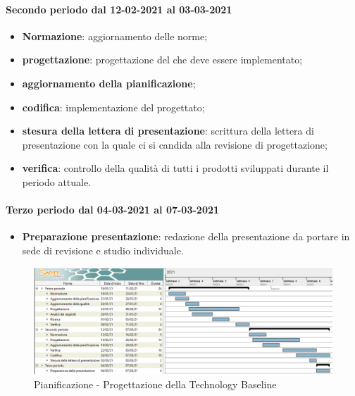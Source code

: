 \paragraph{Secondo periodo dal 12-02-2021 al 03-03-2021} 
\begin{itemize} 
	\item \textbf{Normazione}: aggiornamento delle norme; 
	\item \textbf{progettazione}: progettazione del  che deve essere implementato; 
	\item \textbf{aggiornamento della pianificazione}; 
	\item \textbf{codifica}: implementazione del  progettato; 
	\item \textbf{stesura della lettera di presentazione}: scrittura della lettera di presentazione con la quale ci 
	si candida alla revisione di progettazione; 
	\item \textbf{verifica}: controllo della qualità di tutti i prodotti sviluppati durante il periodo attuale. 
\end{itemize}	 

\paragraph{Terzo periodo dal 04-03-2021 al 07-03-2021} 
\begin{itemize} 
	\item \textbf{Preparazione presentazione}: redazione della presentazione da portare in sede di revisione e 
	studio individuale. 
\end{itemize} 

\newpage 

\begin{landscape} 
	\begin{figure}[h!] 
		\includegraphics[width=24cm]{images/3_Progettazione_della_Technology.png} 
		\caption{Pianificazione - Progettazione della Technology Baseline} 
	\end{figure} 
\end{landscape} 

